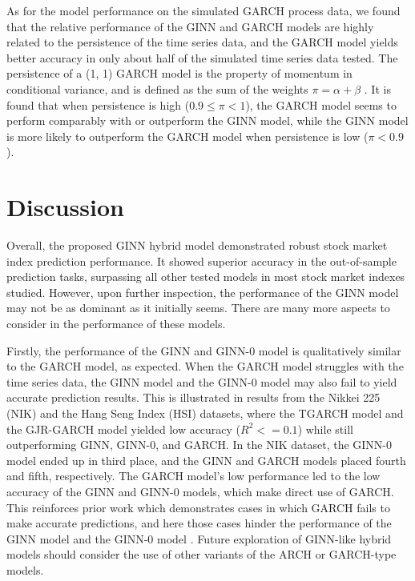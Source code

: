 As for the model performance on the simulated GARCH process data, we found that the relative performance of the GINN and GARCH models are highly related to the persistence of the time series data, and the GARCH model yields better accuracy in only about half of the simulated time series data tested. The persistence of a (1, 1) GARCH model is the property of momentum in conditional variance, and is defined as the sum of the weights $\pi = \alpha + \beta$ \cite{lamoureux_persistence_1990}. It is found that when persistence is high ($0.9 \leq \pi < 1$), the GARCH model seems to perform comparably with or outperform the GINN model, while the GINN model is more likely to outperform the GARCH model when persistence is low ($\pi < 0.9$). 

\section{Discussion}
\label{discuss}
Overall, the proposed GINN hybrid model demonstrated robust stock market index prediction performance. It showed superior accuracy in the out-of-sample prediction tasks, surpassing all other tested models in most stock market indexes studied. However, upon further inspection, the performance of the GINN model may not be as dominant as it initially seems. There are many more aspects to consider in the performance of these models. 

Firstly, the performance of the GINN and GINN-0 model is qualitatively similar to the GARCH model, as expected. When the GARCH model struggles with the time series data, the GINN model and the GINN-0 model may also fail to yield accurate prediction results. This is illustrated in results from the Nikkei 225 (NIK) and the Hang Seng Index (HSI) datasets, where the TGARCH model and the GJR-GARCH model yielded low accuracy ($R^2 <= 0.1$) while still outperforming GINN, GINN-0, and GARCH. In the NIK dataset, the GINN-0 model ended up in third place, and the GINN and GARCH models placed fourth and fifth, respectively. The GARCH model's low performance led to the low accuracy of the GINN and GINN-0 models, which make direct use of GARCH. This reinforces prior work which demonstrates cases in which GARCH fails to make accurate predictions, and here those cases hinder the performance of the GINN model and the GINN-0 model \cite{franses_forecasting_1996, lee_are_1991}. Future exploration of GINN-like hybrid models should consider the use of other variants of the ARCH or GARCH-type models. 

